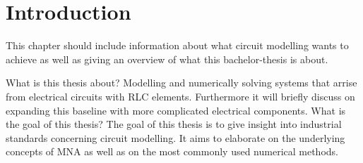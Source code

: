 \chapter{Introduction}
	This chapter should include information about what circuit modelling wants to achieve as well as giving an overview of what this bachelor-thesis is about.

What is this thesis about? \newline
	Modelling and numerically solving systems that arrise from electrical circuits with RLC elements. Furthermore it will briefly discuss on expanding this baseline with more complicated electrical components.
What is the goal of this thesis?\newline
	The goal of this thesis is to give insight into industrial standards concerning circuit modelling. It aims to elaborate on the underlying concepts of MNA as well as on the most commonly used numerical methods.